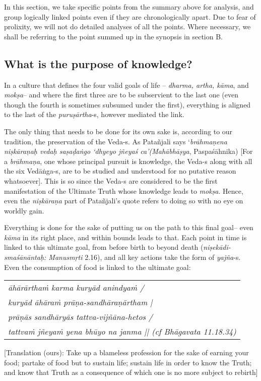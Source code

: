 In this section, we take specific points from the summary above for analysis, and group logically linked points even if they are chronologically apart. Due to fear of prolixity, we will not do detailed analyses of all the points. Where necessary, we shall be referring to the point summed up in the synopsis in section B.
\vskip -40pt

\subsection{What is the purpose of knowledge?}
\vskip -5pt

In a culture that defines the four valid goals of life – {\sl dharma, artha, kāma}, and {\sl mokṣa}– and where the first three are to be subservient to the last one (even though the fourth is sometimes subsumed under the first), everything is aligned to the last of the {\sl puruṣārtha}-s, however mediated the link. 

The only thing that needs to be done for its own sake is, according to our tradition, the preservation of the Veda-s. As Patañjali says ‘{\sl brāhmaṇena niṣkāraṇaḥ vedaḥ saṣaḍaṅgo ‘dhyeyo jñeyaś ca’(Mahābhāṣya}, Paspaśāhnika) [For a {\sl brāhmaṇa}, one whose principal pursuit is knowledge, the Veda-s along with all the six Vedāṅga-s, are to be studied and understood for no putative reason whatsoever]. This is so since the Veda-s are considered to be the first manifestation of the Ultimate Truth whose knowledge leads to {\sl mokṣa}. Hence, even the {\sl niṣkāraṇa} part of Patañjali’s quote refers to doing so with no eye on worldly gain.

Everything is done for the sake of putting us on the path to this final goal– even {\sl kāma} in its right place, and within bounds leads to that. Each point in time is linked to this ultimate goal, from before birth to beyond death ({\sl niṣekādi-smaśānāntaḥ: Manusmṛti} 2.16), and all key actions take the form of {\sl yajña}-s. Even the consumption of food is linked to the ultimate goal:  
\begin{center}
\begin{tabular}{>{\sl}l}
āhārārthaṁ karma kuryād anindyaṁ / \\
kuryād āhāraṁ prāṇa-sandhāraṇārtham | \\
prāṇās sandhāryās tattva-vijñāna-hetos / \\
tattvaṁ jñeyaṁ yena bhūyo na janma || (cf Bhāgavata {\rm 11.18.34}) 
\end{tabular}
\end{center}
[Translation (ours): Take up a blameless profession  for the sake of earning your food; partake of food but to sustain life; sustain life in order to know the Truth; and know that Truth as a consequence of which one is no more subject to rebirth]

